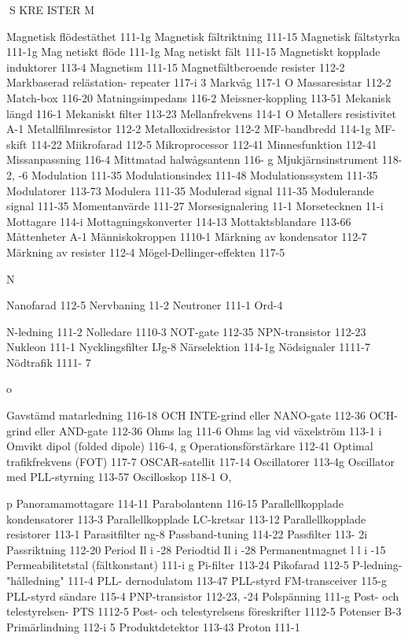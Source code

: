 S KRE ISTER
M

Magnetisk flödestäthet 111-1g
Magnetisk fältriktning 111-15
Magnetisk fältstyrka 111-1g
Mag netiskt flöde 111-1g
Mag netiskt fält 111-15
Magnetiskt kopplade induktorer 113-4
Magnetism 111-15
Magnetfältberoende resister 112-2
Markbaserad relästation- repeater 117-i 3
Markvåg 117-1 O
Massaresistar 112-2
Match-box 116-20
Matningsimpedans 116-2
Meissner-koppling 113-51
Mekanisk längd 116-1
Mekaniskt filter 113-23
Mellanfrekvens 114-1 O
Metallers resistivitet A-1
Metallfilmresistor 112-2
Metalloxidresistor 112-2
MF-bandbredd 114-1g
MF-skift 114-22
Miikrofarad 112-5
Mikroprocessor 112-41
Minnesfunktion 112-41
Missanpassning 116-4
Mittmatad halwågsantenn 116- g
Mjukjärnsinstrument 118-2, -6
Modulation 111-35
Modulationsindex 111-48
Modulationssystem 111-35
Modulatorer 113-73
Modulera 111-35
Modulerad signal 111-35
Modulerande signal 111-35
Momentanvärde 111-27
Morsesignalering 11-1
Morsetecknen 11-i
Mottagare 114-i
Mottagningskonverter 114-13
Mottaktsblandare 113-66
Måttenheter A-1
Människokroppen 1110-1
Märkning av kondensator 112-7
Märkning av resister 112-4
Mögel-Dellinger-effekten 117-5

N

Nanofarad 112-5
Nervbaning 11-2
Neutroner 111-1
Ord-4

N-ledning 111-2
Nolledare 1110-3
NOT-gate 112-35
NPN-transistor 112-23
Nukleon 111-1
Nycklingsfilter IJg-8
Närselektion 114-1g
Nödsignaler 1111-7
Nödtrafik 1111- 7

o

Gavstämd matarledning 116-18
OCH INTE-grind eller NANO-gate 112-36
OCH-grind eller AND-gate 112-36
Ohms lag 111-6
Ohms lag vid växelström 113-1 i
Omvikt dipol (folded dipole) 116-4, g
Operationsförstärkare 112-41
Optimal trafikfrekvens (FOT) 117-7
OSCAR-satellit 117-14
Oscillatorer 113-4g
Oscillator med PLL-styrning 113-57
Oscilloskop 118-1 O,

p
Panoramamottagare 114-11
Parabolantenn 116-15
Parallellkopplade kondensatorer 113-3
Parallellkopplade LC-kretsar 113-12
Parallellkopplade resistorer 113-1
Parasitfilter ng-8
Passband-tuning 114-22
Passfilter 113- 2i
Passriktning 112-20
Period Il i -28
Periodtid Il i -28
Permanentmagnet l l i -15
Permeabilitetstal (fältkonstant) 111-i g
Pi-filter 113-24
Pikofarad 112-5
P-ledning- "hålledning" 111-4
PLL- dernodulatom 113-47
PLL-styrd FM-transceiver 115-g
PLL-styrd sändare 115-4
PNP-transistor 112-23, -24
Polspänning 111-g
Post- och telestyrelsen- PTS 1112-5
Post- och telestyrelsens föreskrifter 1112-5
Potenser B-3
Primärlindning 112-i 5
Produktdetektor 113-43
Proton 111-1

